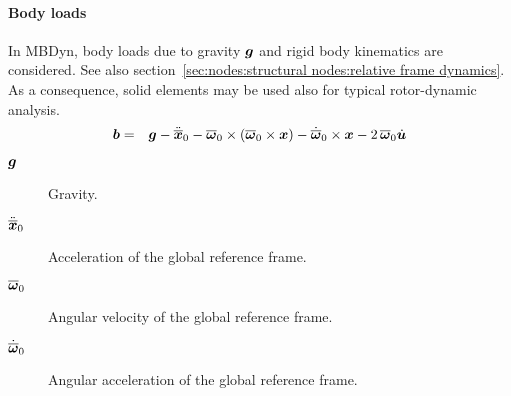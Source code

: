 \paragraph{Body loads}
In MBDyn, body loads due to gravity $\bm{g}$ and rigid body kinematics are considered. See also section~\ref{sec:nodes:structural nodes:relative frame dynamics}.
As a consequence, solid elements may be used also for typical rotor-dynamic analysis.
\begin{eqnarray}
\bm{b} & = & \bm{g} - \ddot{\overline{\bm{x}}}_0 - \overline{\bm{\omega}}_0 \times \left(\overline{\bm{\omega}}_0 \times \bm{x} \right) - \dot{\overline{\bm{\omega}}}_0 \times \bm{x} - 2 \, \overline{\bm{\omega}}_0 \dot{\bm{u}}
\end{eqnarray}

\begin{description}
\item[$\bm{g}$] Gravity.
\item[$\ddot{\overline{\bm{x}}}_0$] Acceleration of the global reference frame.
\item[$\overline{\bm{\omega}}_0$]  Angular velocity of the global reference frame.
\item[$\dot{\overline{\bm{\omega}}}_0$]  Angular acceleration of the global reference frame.
\end{description}

